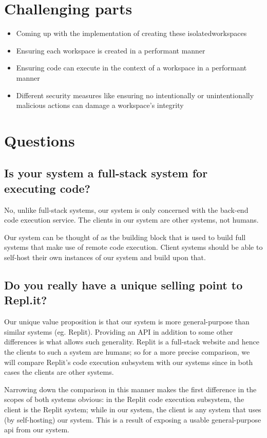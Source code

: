 \documentclass[11pt,a4paper]{article}
\begin{document}
\section{Challenging parts}
\begin{itemize}
    \item Coming up with the implementation of creating these isolated\newline workspaces
    \item Ensuring each workspace is created in a performant manner
    \item Ensuring code can execute in the context of a workspace in a performant manner
    \item Different security measures like ensuring no intentionally or unintentionally malicious actions can damage a
          workspace's integrity
\end{itemize}

\section{Questions}
\subsection{Is your system a full-stack system for executing code?}
No, unlike full-stack systems, our system is only concerned with the back-end code execution service.
The clients in our system are other systems, not humans.

Our system can be thought of as the building block that is used to
build full systems that make use of remote code execution.
Client systems should be able to self-host their own instances of our system and build upon that.

\subsection{Do you really have a unique selling point to Repl.it?}
Our unique value proposition is that our system is more general-purpose than similar systems (eg. Replit).
Providing an API in addition to some other differences is what allows such generality.
Replit is a full-stack website and hence the clients to such a system are humans;
so for a more precise comparison, we will compare Replit's code execution subsystem with our systems
since in both cases the clients are other systems.

Narrowing down the comparison in this manner makes the first difference in the scopes of both systems obvious:
in the Replit code execution subsystem, the client is the Replit system;
while in our system, the client is any system that uses (by self-hosting) our system.
This is a result of exposing a usable general-purpose api from our system.
\end{document}
